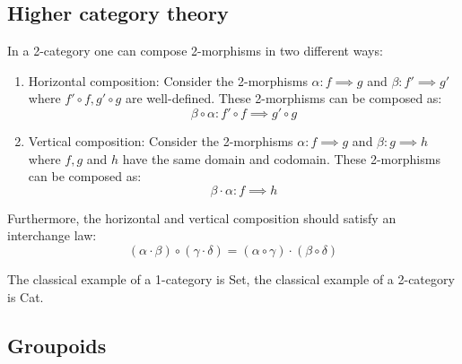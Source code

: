 \subsection{Higher category theory}\label{cat:higher_category_theory}

	\begin{example}[2-Category]
		In a 2-category one can compose 2-morphisms in two different ways:
		\begin{enumerate}
			\item Horizontal composition:
			Consider the 2-morphisms $\alpha:f\implies g$ and $\beta:f'\implies g'$ where $f'\circ f, g'\circ g$ are well-defined. These 2-morphisms can be composed as: \[\beta\circ\alpha: f'\circ f\implies g'\circ g\]
			\item Vertical composition:
			Consider the 2-morphisms $\alpha:f\implies g$ and $\beta:g\implies h$ where $f, g$ and $h$ have the same domain and codomain. These 2-morphisms can be composed as: \[\beta\cdot\alpha: f\implies h\]
		\end{enumerate}
		Furthermore, the horizontal and vertical composition should satisfy an interchange law:
		\begin{equation}
			(\alpha\cdot\beta)\circ(\gamma\cdot\delta) = (\alpha\circ\gamma)\cdot(\beta\circ\delta)
		\end{equation}
	\end{example}
	
	
	\begin{example}
		The classical example of a 1-category is Set, the classical example of a 2-category is Cat.
	\end{example}

\subsection{Groupoids}

